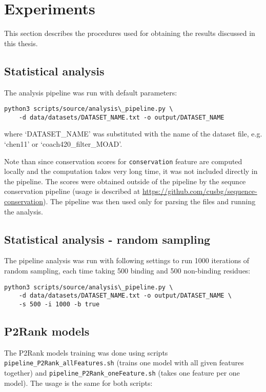 \documentclass[12pt,a4paper]{report}
\begin{document}
\section{Experiments} \label{a:experiments}

This section describes the procedures used for obtaining the results discussed in this thesis.

\subsection{Statistical analysis} \label{a:experiments1}
The analysis pipeline was run with default parameters:

\begin{Verbatim}[fontsize=\small]
python3 scripts/source/analysis\_pipeline.py \
	-d data/datasets/DATASET_NAME.txt -o output/DATASET_NAME
\end{Verbatim}

where `DATASET\_NAME' was substituted with the name of the dataset file, e.g. `chen11' or `coach420\_filter\_MOAD'.

Note than since conservation scores for \texttt{conservation} feature are computed locally and the computation takes very long time, it was not included directly in the pipeline. The scores were obtained outside of the pipeline by the sequnce conservation pipeline (usage is described at \url{https://github.com/cusbg/sequence-conservation}). The pipeline was then used only for parsing the files and running the analysis.

\subsection{Statistical analysis - random sampling} \label{a:experiments2}
The pipeline analysis was run with following settings to run 1000 iterations of random sampling, each time taking 500 binding and 500 non-binding residues:

\begin{Verbatim}[fontsize=\small]
python3 scripts/source/analysis\_pipeline.py \
	-d data/datasets/DATASET_NAME.txt -o output/DATASET_NAME \
	-s 500 -i 1000 -b true
\end{Verbatim}

\subsection{P2Rank models} \label{a:experiments3}

The P2Rank models training was done using scripts \newline \texttt{pipeline\_P2Rank\_allFeatures.sh} (trains one model with all given features together) and \texttt{pipeline\_P2Rank\_oneFeature.sh} (takes one feature per one model). The usage is the same for both scripts:
\end{document}
